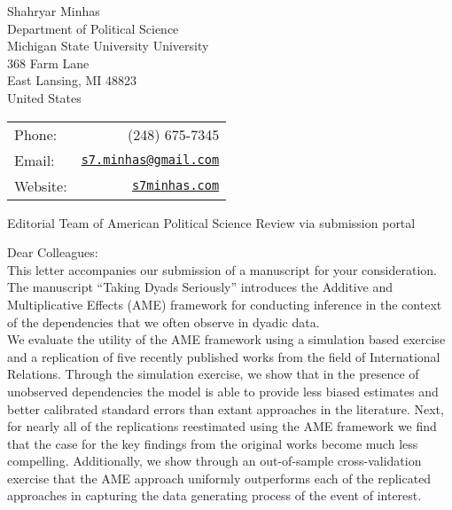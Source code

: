 \documentclass[letterpaper]{article}
\begin{document}
\thispagestyle{empty}

  
  
  \begin{minipage}{0.64\linewidth}
Shahryar Minhas \\
Department of Political Science \\
Michigan State University University \\
368 Farm Lane \\
East Lansing, MI 48823\\
United States
\end{minipage}
\begin{minipage}{0.45\linewidth}
  \begin{tabular}{lr}
    Phone: & (248) 675-7345 \\
    Email: & \href{mailto:s7.minhas@gmail.com}{\tt s7.minhas@gmail.com}  \\
    Website:& \href{http://s7minhas.com/}{\tt s7minhas.com}
  \end{tabular}
\end{minipage}
  
\vspace{1.5in}

{Editorial Team of American Political Science Review via submission portal}

\vspace{0.5in}

Dear Colleagues:\\[1ex]

This letter accompanies our submission of a manuscript for your consideration. The manuscript ``Taking Dyads Seriously'' introduces the Additive and Multiplicative Effects (AME) framework for conducting inference in the context of the dependencies that we often observe in dyadic data.\\[1ex]

We evaluate the utility of the AME framework using a simulation based exercise and a replication of five recently published works from the field of International Relations. Through the simulation exercise, we show that in the presence of unobserved dependencies the model is able to provide less biased estimates and better calibrated standard errors than extant approaches in the literature. Next, for nearly all of the replications reestimated using the AME framework we find that the case for the key findings from the original works become much less compelling. Additionally, we show through an out-of-sample cross-validation exercise that the AME approach uniformly outperforms each of the replicated approaches in capturing the data generating process of the event of interest.\\[1ex] 
\end{document}
